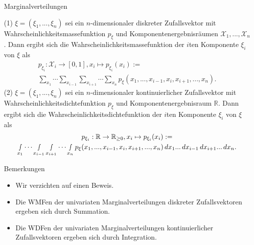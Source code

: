 \documentclass[
  8pt,
  ignorenonframetext,
]{beamer}
\providecommand{\tightlist}{%
  \setlength{\itemsep}{0pt}\setlength{\parskip}{0pt}}
\begin{document}
\begin{frame}{Marginalverteilungen}
\protect\hypertarget{marginalverteilungen-1}{}
\footnotesize
\begin{theorem}
\justifying
\normalfont
(1) $\xi= (\xi_1,...,\xi_n)$ sei ein $n$-dimensionaler diskreter Zufallsvektor
mit Wahrscheinlichkeitsmassefunktion $p_\xi$ und Komponentenergebnisräumen 
$\mathcal{X}_1, ..., \mathcal{X}_n$. Dann ergibt sich die 
Wahrscheinlichkeitsmassefunktion der $i$ten Komponente $\xi_i$ von $\xi$ als
\begin{multline}
p_{\xi_i} : \mathcal{X}_i \to [0,1], x_i \mapsto p_{\xi_i}(x_i) := \\
\sum_{x_1} \cdots \sum_{x_{i-1}} \sum_{x_{i+1}} \cdots \sum_{x_n} p_\xi(x_1,...,x_{i-1},x_i,x_{i+1}, ...,x_n).
\end{multline}
(2) $\xi= (\xi_1,...,\xi_n)$ sei ein $n$-dimensionaler kontinuierlicher Zufallsvektor 
mit Wahrscheinlichkeitsdichtefunktion $p_\xi$ und Komponentenergebnisraum $\mathbb{R}$. 
Dann ergibt sich die Wahrscheinlichkeitsdichtefunktion der $i$ten Komponente $\xi_i$ von $\xi$ als
\begin{multline}
p_{\xi_i} : \mathbb{R} \to \mathbb{R}_{\ge 0},  x_i \mapsto p_{\xi_i}(x_i) :=  \\
\smallint_{x_1} \cdots \smallint_{x_{i-1}} \smallint_{x_{i+1}} \cdots \smallint_{x_n}
   p_\xi(x_1,..., x_{i-1},x_i,x_{i+1}, ...,x_n)
   \,dx_1...\,dx_{i-1}\,dx_{i+1}...\,dx_n.
\end{multline}
\end{theorem}
\vspace{-2mm}

Bemerkungen \vspace{-1mm}

\begin{itemize}
\tightlist
\item
  \justifying Wir verzichten auf einen Beweis.
\item
  Die WMFen der univariaten Marginalverteilungen diskreter
  Zufallsvektoren ergeben sich durch Summation.
\item
  Die WDFen der univariaten Marginalverteilungen kontinuierlicher
  Zufallsvektoren ergeben sich durch Integration.
\end{itemize}
\end{frame}
\end{document}
